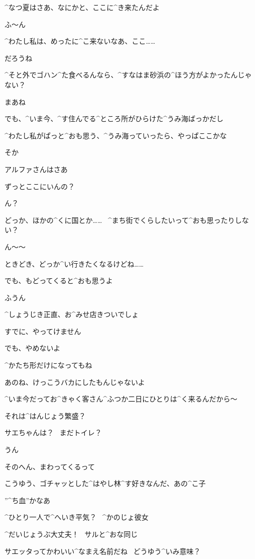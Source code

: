 \page[108]
\M ^{なつ}{夏}はさあ、なにかと、ここに^{き}{来}たんだよ

\A ふ〜ん

\page
\A ^{わたし}{私}は、めったに^{こ}{来}ないなあ、ここ……

\M だろうね

\A ^{そと}{外}でゴハン^{た}{食}べるんなら、^{すなはま}{砂浜}の^{ほう}{方}がよかったんじゃない？

\M まあね

\M でも、^{いま}{今}、^{す}{住}んでる^{ところ}{所}がひらけた^{うみ}{海}ばっかだし

\M ^{わたし}{私}がぱっと^{おも}{思}う、^{うみ}{海}っていったら、やっぱここかな

\A そか

\page
\M アルファさんはさあ

\M ずっとここにいんの？

\A ん？

\M どっか、ほかの^{くに}{国}とか……
\ ^{まち}{街}でくらしたいって^{おも}{思}ったりしない？

\A ん〜〜

\A ときどき、どっか^{い}{行}きたくなるけどね……

\A でも、もどってくると^{おも}{思}うよ

\M ふうん

\page
\M ^{しょうじき}{正直}、お^{みせ}{店}きついでしょ

\A すでに、やってけません

\A でも、やめないよ

\A ^{かたち}{形}だけになってもね

\A あのね、けっこうバカにしたもんじゃないよ

\A ^{いま}{今}だってお^{きゃく}{客}さん^{ふつか}{二日}にひとりは^{く}{来}るんだから〜

\M それは^{はんじょう}{繁盛}？

\page
\A サエちゃんは？
\ まだトイレ？

\M うん

\M そのへん、まわってくるって

\M こうゆう、ゴチャッとした^{はやし}{林}^{す}{好}きなんだ、あの^{こ}{子}

\page
\M ”^{ち}{血}”かなあ

\A ^{ひとり}{一人}で^{へいき}{平気}？
\ ^{かのじょ}{彼女}

\M ^{だいじょうぶ}{大丈夫}！
\ サルと^{おな}{同}じ

\A サエッタってかわいい^{なまえ}{名前}だね
\ どうゆう^{いみ}{意味}？

